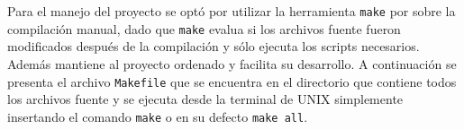
Para el manejo del proyecto se optó por utilizar la herramienta \texttt{make} por sobre la compilación manual, dado que \texttt{make} evalua si los archivos fuente fueron modificados después de la compilación y sólo ejecuta los scripts necesarios. Además mantiene al proyecto ordenado y facilita su desarrollo. A continuación se presenta el archivo \texttt{Makefile} que se encuentra en el directorio que contiene todos los archivos fuente y se ejecuta desde la terminal de UNIX simplemente insertando el comando \texttt{make} o en su defecto \texttt{make all}. 

	

